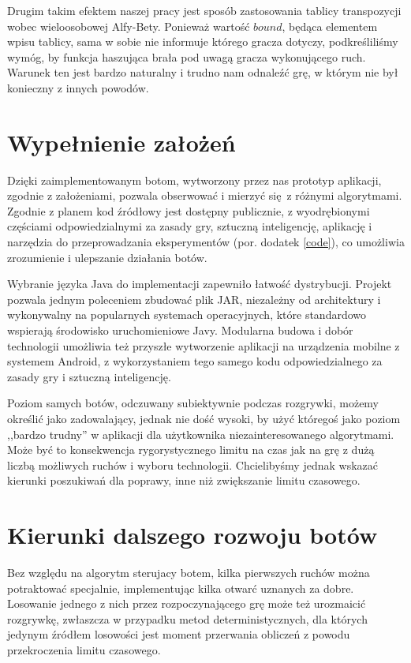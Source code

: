 \documentclass{pracamgr}
\begin{document}
Drugim takim efektem naszej pracy jest sposób zastosowania tablicy transpozycji wobec wieloosobowej Alfy-Bety.
Ponieważ wartość \(bound\), będąca elementem wpisu tablicy, sama w sobie nie informuje którego gracza dotyczy, podkreśliliśmy wymóg, by funkcja haszująca brała pod uwagą gracza wykonującego ruch.
Warunek ten jest bardzo naturalny i trudno nam odnaleźć grę, w którym nie był konieczny z innych powodów.

\section{Wypełnienie założeń}

Dzięki zaimplementowanym botom, wytworzony przez nas prototyp aplikacji, zgodnie z założeniami, pozwala obserwować i mierzyć się z różnymi algorytmami.
Zgodnie z planem kod źródłowy jest dostępny publicznie, z wyodrębionymi częściami odpowiedzialnymi za zasady gry, sztuczną inteligencję, aplikację i narzędzia do przeprowadzania eksperymentów (por. dodatek \ref{code}), co umożliwia zrozumienie i ulepszanie działania botów.

Wybranie języka Java do implementacji zapewniło łatwość dystrybucji.
Projekt pozwala jednym poleceniem zbudować plik JAR, niezależny od architektury i wykonywalny na popularnych systemach operacyjnych, które standardowo wspierają środowisko uruchomieniowe Javy.
Modularna budowa i dobór technologii umożliwia też przyszłe wytworzenie aplikacji na urządzenia mobilne z systemem Android, z wykorzystaniem tego samego kodu odpowiedzialnego za zasady gry i sztuczną inteligencję.

Poziom samych botów, odczuwany subiektywnie podczas rozgrywki, możemy określić jako zadowalający, jednak nie dość wysoki, by użyć któregoś jako poziom ,,bardzo trudny'' w aplikacji dla użytkownika niezainteresowanego algorytmami.
Może być to konsekwencja rygorystycznego limitu na czas jak na grę z dużą liczbą możliwych ruchów i wyboru technologii.
Chcielibyśmy jednak wskazać kierunki poszukiwań dla poprawy, inne niż zwiększanie limitu czasowego.

\section{Kierunki dalszego rozwoju botów}

Bez względu na algorytm sterujacy botem, kilka pierwszych ruchów można potraktować specjalnie, implementując kilka otwarć uznanych za dobre.
Losowanie jednego z nich przez rozpoczynającego grę może też urozmaicić rozgrywkę, zwłaszcza w przypadku metod deterministycznych, dla których jedynym źródłem losowości jest moment przerwania obliczeń z powodu przekroczenia limitu czasowego.
\end{document}
